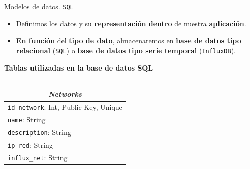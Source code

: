 \documentclass[aspectratio=169,xcolor=dvipsnames]{beamer}
\begin{document}
	\begin{frame}{Modelos de datos. \texttt{SQL}}
		
		\begin{itemize}
			\item Definimos los datos y su \textbf{representación dentro} de nuestra \textbf{aplicación}.
			
			\item \textbf{En función} del \textbf{tipo de dato}, almacenaremos en \textbf{base de datos tipo relacional} (\texttt{SQL}) o \textbf{base de datos tipo serie temporal} (\texttt{InfluxDB}).
		\end{itemize}

		\vspace{11px}

		\textbf{Tablas utilizadas en la base de datos SQL}

		\begin{columns}
			\begin{column}{0.5\textwidth}
				\begin{table}[h!]
					\centering
					\begin{tabular}{|l|}
						\hline
						\multicolumn{1}{|c|}{\textit{\textbf{Networks}}} \\ \hline
						\texttt{id\_network}: Int, Public Key, Unique                 \\ \hline
						\texttt{name}: String                                     \\ \hline
						\texttt{description}: String                              \\ \hline
						\texttt{ip\_red}: String                                  \\ \hline
						\texttt{influx\_net}: String                              \\ \hline
					\end{tabular}
				\end{table}
			\end{column}
		

\end{columns}
\end{frame}
\end{document}
